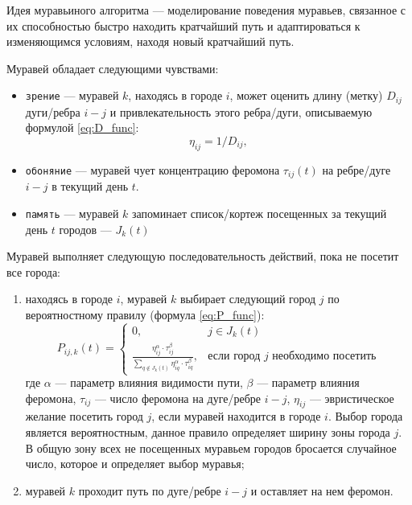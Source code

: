Идея муравьиного алгоритма \cite{info_antAlg} --- моделирование поведения муравьев, связанное с их способностью быстро находить кратчайший путь и адаптироваться к изменяющимся условиям, находя новый кратчайший путь.

Муравей обладает следующими чувствами:

\begin{itemize}[label*=--]
	\item \texttt{зрение} --- муравей $k$, находясь в городе $i$, может оценить длину (метку) $D_{ij}$ дуги/ребра $i-j$ и привлекательность этого ребра/дуги, описываемую формулой \ref{eq:D_func}:
	\begin{equation}
		\label{eq:D_func}
		\eta_{ij} = 1 / D_{ij},
	\end{equation}
	
	\item \texttt{обоняние} --- муравей чует концентрацию феромона $\tau_{ij}(t)$ на ребре/дуге $i-j$ в текущий день $t$.
	
	\item \texttt{память} --- муравей $k$ запоминает список/кортеж посещенных за текущий день $t$ городов --- $J_k(t)$
\end{itemize}

Муравей выполняет следующую последовательность действий, пока не посетит все города:

\begin{enumerate}[label={\arabic*)}]
	\item находясь в городе $i$, муравей $k$ выбирает следующий город $j$ по вероятностному правилу (формула \ref{eq:P_func}):
	\begin{equation}
		\label{eq:P_func}
		P_{ij, k}(t) = 
		\begin{cases}
			0,  & j \in J_k(t) \\
			\frac{\eta_{ij}^\alpha \cdot \tau_{ij}^\beta}{\displaystyle\sum_{q \notin J_k(t)} \eta^\alpha_{iq} \cdot \tau^\beta_{iq}}, & \textrm{если город $j$ необходимо посетить} 
		\end{cases}
	\end{equation}
	где $\alpha$ --- параметр влияния видимости пути, $\beta$ --- параметр влияния феромона, $\tau_{ij}$ --- число феромона на дуге/ребре $i-j$, $\eta_{ij}$ --- эвристическое желание посетить город $j$, если муравей находится в городе $i$. 
	Выбор города является вероятностным, данное правило определяет ширину зоны города $j$. 
	В общую зону всех не посещенных муравьем городов бросается случайное число, которое и определяет выбор муравья;
	\item муравей $k$ проходит путь по дуге/ребре $i-j$ и оставляет на нем феромон.
\end{enumerate}

